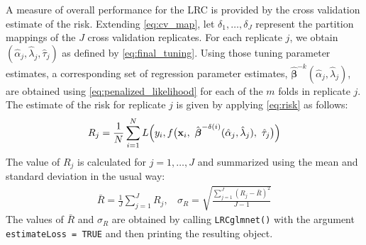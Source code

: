 \documentclass{article}
\begin{document}
A measure of overall performance for the LRC is provided by the cross validation estimate of the risk. Extending
\eqref{eq:cv_map}, let $\delta_1, \ldots, \delta_J$
represent the partition mappings of the $J$ cross validation replicates.  For each replicate $j$, we obtain $(\hat\alpha_j, 
\hat\lambda_j, \hat\tau_j)$ as defined by \eqref{eq:final_tuning}.  Using those tuning parameter estimates, a
corresponding set of regression
parameter estimates, $\hat{\boldsymbol{\beta}}^{-k}(\hat\alpha_j,\hat\lambda_j)$, are obtained using \eqref{eq:penalized_likelihood} 
for each of the $m$ folds in replicate $j$.  The estimate of the risk for replicate $j$ is given by applying \eqref{eq:risk} as follows:
\begin{align}
\label{eq:final_risk_j}
R_j  = \frac{1}{N}\sum_{i=1}^N L \Bigl(y_i, f\bigl(\mathbf{x}_i,
~\hat{\boldsymbol{\beta}}^{-\delta(i)}(\hat\alpha_j,\hat\lambda_j),  ~\hat\tau_j \bigr) \Bigr)
\end{align}
The value of $R_j$ is calculated for $j = 1,\ldots,J$ and summarized using the mean and standard deviation
in the usual way:
\begin{align}
\bar{R} = \frac{1}{J}\sum_{j=1}^J R_j,  ~~~~ \sigma_R = \sqrt{\frac{\sum_{j=1}^J(R_j - \bar{R})^2}{J-1}}
\end{align}
The values of $\bar{R}$ and $\sigma_R$ are obtained by calling {\tt LRCglmnet()} with the argument {\tt estimateLoss = TRUE}
and then printing the resulting object.
\end{document}
